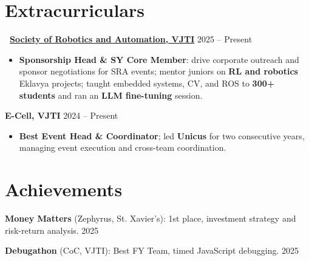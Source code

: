 \documentclass[letterpaper,10.5pt]{article}
\newcommand{\weblink}[2]{\faGlobe\ \href{#1}{#2}}
\begin{document}
\section{Extracurriculars}

\noindent\textbf{\weblink{https://sravjti.in/}{Society of Robotics and Automation, VJTI}} \hfill 2025 -- Present
\begin{itemize}[leftmargin=*,itemsep=0.3pt,topsep=0.8pt,parsep=0pt]
    \item \textbf{Sponsorship Head \& SY Core Member}: drive corporate outreach and sponsor negotiations for SRA events; mentor juniors on \textbf{RL and robotics} Eklavya projects; taught embedded systems, CV, and ROS to \textbf{300+ students} and ran an \textbf{LLM fine-tuning} session.
\end{itemize}

\noindent\textbf{E-Cell, VJTI} \hfill 2024 -- Present
\begin{itemize}[leftmargin=*,itemsep=0.3pt,topsep=0.8pt,parsep=0pt]
    \item \textbf{Best Event Head \& Coordinator}; led \textbf{Unicus} for two consecutive years, managing event execution and cross-team coordination.
\end{itemize}

\section{Achievements}

\noindent\textbf{Money Matters} (Zephyrus, St. Xavier's): 1st place, investment strategy and risk-return analysis. \hfill 2025

\noindent\textbf{Debugathon} (CoC, VJTI): Best FY Team, timed JavaScript debugging. \hfill 2025
\end{document}
